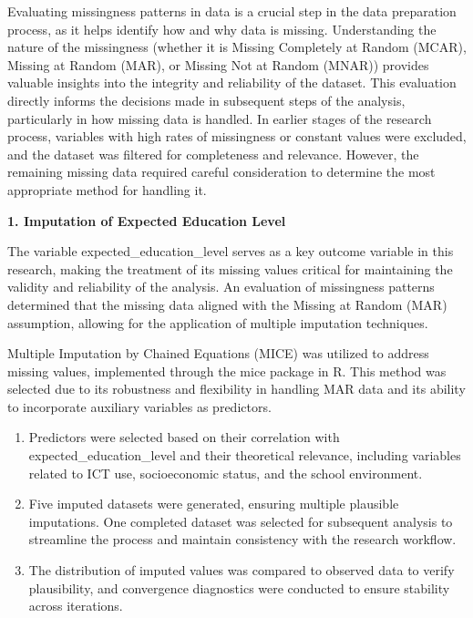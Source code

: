 \documentclass[
]{article}
\begin{document}
Evaluating missingness patterns in data is a crucial step in the data
preparation process, as it helps identify how and why data is missing.
Understanding the nature of the missingness (whether it is Missing
Completely at Random (MCAR), Missing at Random (MAR), or Missing Not at
Random (MNAR)) provides valuable insights into the integrity and
reliability of the dataset. This evaluation directly informs the
decisions made in subsequent steps of the analysis, particularly in how
missing data is handled. In earlier stages of the research process,
variables with high rates of missingness or constant values were
excluded, and the dataset was filtered for completeness and relevance.
However, the remaining missing data required careful consideration to
determine the most appropriate method for handling it.

\textbf{1. Imputation of Expected Education Level}

The variable expected\_education\_level serves as a key outcome variable
in this research, making the treatment of its missing values critical
for maintaining the validity and reliability of the analysis. An
evaluation of missingness patterns determined that the missing data
aligned with the Missing at Random (MAR) assumption, allowing for the
application of multiple imputation techniques.

Multiple Imputation by Chained Equations (MICE) was utilized to address
missing values, implemented through the mice package in R. This method
was selected due to its robustness and flexibility in handling MAR data
and its ability to incorporate auxiliary variables as predictors.

\begin{enumerate}
\def\labelenumi{\arabic{enumi}.}
\item
  Predictors were selected based on their correlation with
  expected\_education\_level and their theoretical relevance, including
  variables related to ICT use, socioeconomic status, and the school
  environment.
\item
  Five imputed datasets were generated, ensuring multiple plausible
  imputations. One completed dataset was selected for subsequent
  analysis to streamline the process and maintain consistency with the
  research workflow.
\item
  The distribution of imputed values was compared to observed data to
  verify plausibility, and convergence diagnostics were conducted to
  ensure stability across iterations.
\end{enumerate}
\end{document}
